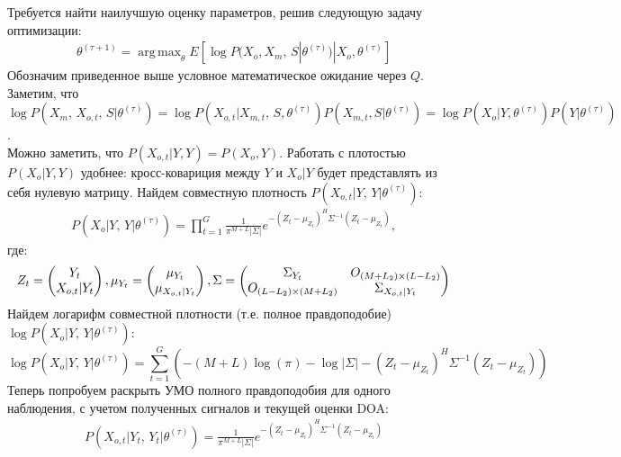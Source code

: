 \documentclass[11pt]{article}
\DeclareMathOperator*{\argmax}{arg\,max}
\begin{document}
\begin{center}
\fontsize{16}{20}\selectfont {}
\end{center}
Требуется найти наилучшую оценку параметров, решив следующую задачу оптимизации:
\begin{gather}
\theta^{(\tau+1)}=\argmax_{\theta} E[\log P(X_o, X_m, \, S|\theta^{(\tau)})|X_o, \theta^{(\tau)}]
\end{gather}
Обозначим приведенное выше условное математическое ожидание через $Q$. 
Заметим, что \\ $\log P(X_m, \, X_{o,t}, \, S|\theta^{(\tau)}) = \log P(X_{o,t}|X_{m,t}, \, S,\theta^{(\tau)})P(X_{m,t}, S|\theta^{(\tau)}) = \log P(X_o|Y,\theta^{(\tau)})P(Y|\theta^{(\tau)})$.\\
Можно заметить, что $P(X_{o,t}|Y, Y) = P(X_o, Y)$. Работать с плотостью $P(X_o|Y, Y)$ удобнее: кросс-ковариция между $Y$ и $X_o|Y$ будет представлять из себя нулевую матрицу.
Найдем совместную плотность $P(X_{o,t}|Y, \, Y|\theta^{(\tau)})$:
\begin{gather}
P(X_o|Y, \, Y|\theta^{(\tau)}) = \prod_{t=1}^G \frac{1}{\pi^{M+L}|\Sigma|}e^{-(Z_t-\mu_{Z_t})^H\Sigma^{-1}(Z_t-\mu_{Z_t})},
\end{gather}
где:
\begin{equation*}
Z_t = \begin{pmatrix}
Y_t\\
X_{o,t}|Y_t
\end{pmatrix},
\mu_{Y_t} = \begin{pmatrix}
\mu_{Y_t}\\
\mu_{X_{o,t}|Y_t}
\end{pmatrix}\\,
\Sigma = 
\begin{pmatrix}
\Sigma_{Y_t}&O_{(M+L_2)\times (L-L_2)}\\
O_{(L-L_2)\times (M+L_2)}&\Sigma_{X_{o,t}|Y_t}
\end{pmatrix}
\end{equation*}
Найдем логарифм совместной плотности (т.е. полное правдоподобие) $\log P(X_o|Y, \, Y|\theta^{(\tau)})$:
\begin{equation*}
\log P(X_o|Y, \, Y|\theta^{(\tau)}) = \sum_{t=1}^G \left(-(M+L)\log(\pi)-\log|\Sigma|-(Z_t-\mu_{Z_t})^H\Sigma^{-1}(Z_t-\mu_{Z_t})\right)
\end{equation*}
Теперь попробуем раскрыть УМО полного правдоподобия для одного наблюдения, с учетом полученных сигналов и текущей оценки DOA:
\begin{gather}
P(X_{o,t}|Y_t, \, Y_t|\theta^{(\tau)}) = \frac{1}{\pi^{M+L}|\Sigma|}e^{-(Z_t-\mu_{Z_t})^H\Sigma^{-1}(Z_t-\mu_{Z_t})}
\end{gather}
\end{document}
